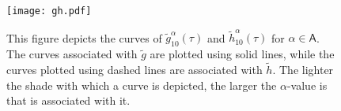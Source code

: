 \documentclass[twoside,reqno,11pt]{fcaa-var} %
\begin{document}



\begin{figure}[htb]
\centering
\texttt{[image: gh.pdf]}
\caption{This figure depicts the curves of $\widetilde{g}_{10}^{\alpha}(\tau)$ and $\widetilde{h}_{10}^{\alpha}(\tau)$ for $\alpha\in\mathsf{A}$. The curves associated with $\widetilde{g}$ are plotted using solid lines, while the curves plotted using dashed lines are associated with $\widetilde{h}$. The lighter the shade with which a curve is depicted, the larger the $\alpha$-value is that is associated with it.}
\label{fig:gandh}
\end{figure}
\end{document}
